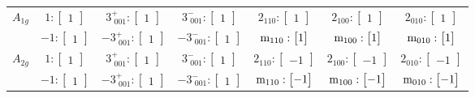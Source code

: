 \documentclass[fleqn,8pt,landscape]{jsarticle}
\begin{document}
\begin{longtable}{ccccccc}
$ A_{1g} $ & $ 1:\begin{bmatrix} 1 \end{bmatrix} $ & $ 3^{+}_{\,\,001}:\begin{bmatrix} 1 \end{bmatrix} $ & $ 3^{-}_{\,\,001}:\begin{bmatrix} 1 \end{bmatrix} $ & $ 2{}_{110}:\begin{bmatrix} 1 \end{bmatrix} $ & $ 2{}_{100}:\begin{bmatrix} 1 \end{bmatrix} $ & $ 2{}_{010}:\begin{bmatrix} 1 \end{bmatrix} $ \\
& $ -1:\begin{bmatrix} 1 \end{bmatrix} $ & $ -3^{+}_{\,\,001}:\begin{bmatrix} 1 \end{bmatrix} $ & $ -3^{-}_{\,\,001}:\begin{bmatrix} 1 \end{bmatrix} $ & $ {\rm m}_{110}:\begin{bmatrix} 1 \end{bmatrix} $ & $ {\rm m}_{100}:\begin{bmatrix} 1 \end{bmatrix} $ & $ {\rm m}_{010}:\begin{bmatrix} 1 \end{bmatrix} $ \\ \hline
$ A_{2g} $ & $ 1:\begin{bmatrix} 1 \end{bmatrix} $ & $ 3^{+}_{\,\,001}:\begin{bmatrix} 1 \end{bmatrix} $ & $ 3^{-}_{\,\,001}:\begin{bmatrix} 1 \end{bmatrix} $ & $ 2{}_{110}:\begin{bmatrix} -1 \end{bmatrix} $ & $ 2{}_{100}:\begin{bmatrix} -1 \end{bmatrix} $ & $ 2{}_{010}:\begin{bmatrix} -1 \end{bmatrix} $ \\
& $ -1:\begin{bmatrix} 1 \end{bmatrix} $ & $ -3^{+}_{\,\,001}:\begin{bmatrix} 1 \end{bmatrix} $ & $ -3^{-}_{\,\,001}:\begin{bmatrix} 1 \end{bmatrix} $ & $ {\rm m}_{110}:\begin{bmatrix} -1 \end{bmatrix} $ & $ {\rm m}_{100}:\begin{bmatrix} -1 \end{bmatrix} $ & $ {\rm m}_{010}:\begin{bmatrix} -1 \end{bmatrix} $ \\ \hline

\end{longtable}
\end{document}
